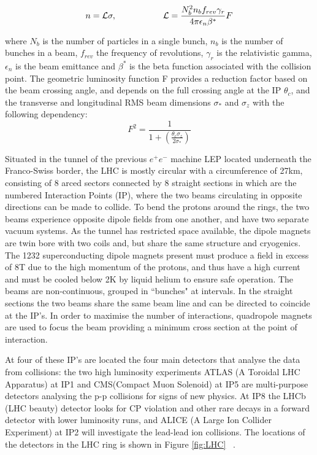 \begin{equation}
n = \mathcal{L} \sigma, \hspace{.75in} \mathcal{L} = \frac{N_{b}^{2} n_{b} f_{rev} \gamma_{r}}{4 \pi \epsilon_{n} \beta^{*}}F
\label{eq:lumi}
\end{equation}

where $N_{b}$ is the number of particles in a single bunch, $n_{b}$ is the number of bunches in a beam, $f_{rev}$ the frequency of revolutions, $\gamma_{r}$ is the relativistic gamma, $\epsilon_{n}$ is the beam emittance and $\beta^{*}$ is the beta function associated with the collision point. The geometric luminosity function F provides a reduction factor based on the beam crossing angle, and depends on the full crossing angle at the IP $\theta_{c}$, and the transverse and longitudinal RMS beam dimensions $\sigma_{*}$ and $\sigma_{z}$ with the following dependency:
\begin{equation}
F^{2} = \frac{1}{1+(\frac{\theta_{c} \sigma_{z}}{2\sigma_{*}})}
\label{eq:lumi2}
\end{equation}

Situated in the tunnel of the previous $e^{+}e^{-}$ machine LEP located underneath the Franco-Swiss border,  the LHC is mostly circular with a circumference of 27km, consisting of 8 arced sectors connected by 8 straight sections in which are the numbered Interaction Points (IP), where the two beams circulating in opposite directions can be made to collide. To bend the protons around the rings, the two beams experience opposite dipole fields from one another, and have two separate vacuum systems. As the tunnel has restricted space available, the dipole magnets are twin bore with two coils and, but share the same structure and cryogenics. The 1232 superconducting dipole magnets present must produce a field in excess of 8T due to the high momentum of the protons, and thus have a high current and must be cooled below 2K by liquid helium to ensure safe operation. The beams are non-continuous, grouped in ``bunches" at intervals. In the straight sections the two beams share the same beam line and can be directed to coincide at the IP's. In order to maximise the number of interactions, quadropole magnets are used to focus the beam providing a minimum cross section at the point of interaction.

At four of these IP's are located the four main detectors that analyse the data from collisions: the two high luminosity experiments ATLAS (A Toroidal LHC Apparatus) at IP1 and CMS(Compact Muon Solenoid) at IP5 are multi-purpose detectors analysing the p-p collisions for signs of new physics. At IP8 the LHCb (LHC beauty) detector looks for CP violation and other rare decays in a forward detector with lower luminosity runs, and ALICE (A Large Ion Collider Experiment) at IP2 will investigate the lead-lead ion collisions. The locations of the detectors in the LHC ring is shown in Figure \ref{fig:LHC}~\cite{LHCConcept} .

